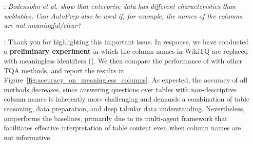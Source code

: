 
\begin{shaded}
{
: 
\emph{Bodensohn et al. show that enterprise data has different characteristics than webtables. Can AutoPrep also be used if, for example, the names of the columns are not meaningful/clear?
}
}
\end{shaded}



:
Thank you for highlighting this important issue. In response, we have conducted a \textbf{preliminary experiment} in which the column names in WikiTQ are replaced with meaningless identifiers (\eg {}). We then compare the performance of \sys with other TQA methods, and report the results in Figure~\ref{fig:accuracy_on_meaningless_columns}. As expected, the accuracy of all methods decreases, since answering questions over tables with non-descriptive column names is inherently more challenging and demands a combination of table reasoning, data preparation, and deep tabular data understanding. Nevertheless, \sys outperforms the baselines, primarily due to its multi-agent framework that facilitates effective interpretation of table content even when column names are not informative. 

